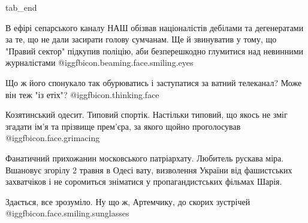   tab_end
\fi

В ефірі сепарського каналу НАШ обізвав націоналістів дебілами та дегенератами
за те, що не дали засирати голову сумчанам. Ще й звинуватив у тому, що "Правий
сектор" підкупив поліцію, аби безперешкодно глумитися над невинними
журналістами  @igg{fbicon.beaming.face.smiling.eyes} 

Що ж його спонукало так обурюватись і заступатися за ватний телеканал? Може він
теж "із етіх"?  @igg{fbicon.thinking.face} 

Козятинський одесит. Типовий спортік. Настільки типовий, що якось не зміг
згадати ім’я та прізвище прем’єра, за якого щойно проголосував  @igg{fbicon.face.grimacing} 

Фанатичний прихожанин московського патріархату. Любитель рускава міра. Вшановує
згорілу 2 травня в Одесі вату, визволення України від фашистських захватчіков і
не соромиться зніматися у пропагандистських фільмах Шарія. 

Здається, все зрозуміло. Ну що ж, Артемчику, до скорих зустрічей
@igg{fbicon.face.smiling.sunglasses} 

